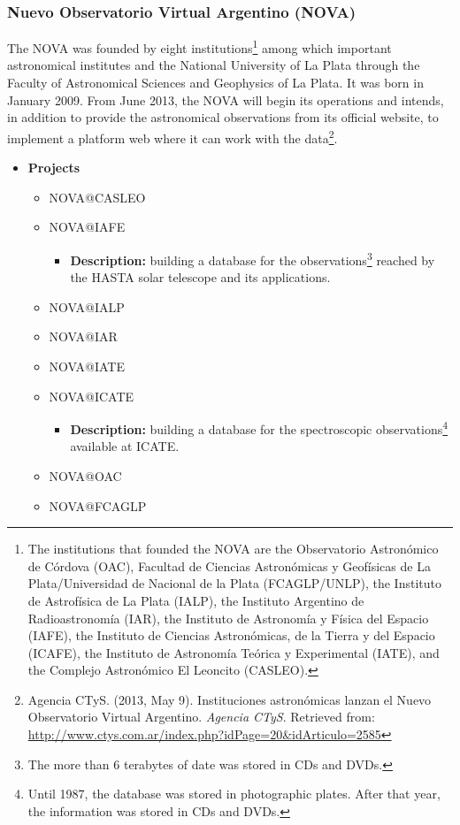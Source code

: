 \subsubsection{Nuevo Observatorio Virtual Argentino (NOVA)}
The NOVA \cite{website:nova-home} was founded by eight institutions\footnote{The
institutions that founded the NOVA are the Observatorio Astron\'{o}mico de
C\'{o}rdova (OAC), Facultad de Ciencias Astron\'{o}micas y Geof\'{i}sicas de La
Plata/Universidad de Nacional de la Plata (FCAGLP/UNLP), the Instituto de
Astrof\'{i}sica de La Plata (IALP), the Instituto Argentino de
Radioastronom\'{i}a (IAR), the Instituto de Astronom\'{i}a y F\'{i}sica del
Espacio (IAFE), the Instituto de Ciencias Astron\'{o}micas, de la Tierra y del
Espacio (ICAFE), the Instituto de Astronom\'{i}a Te\'{o}rica y Experimental
(IATE), and the Complejo Astron\'{o}mico El Leoncito (CASLEO).} among which
important astronomical institutes and the National University of La Plata
through the Faculty of Astronomical Sciences and Geophysics of La Plata. It was
born in January 2009.  From June 2013, the NOVA will begin its operations and
intends, in addition to provide the astronomical observations from its official
website, to implement a platform web where it can work with the
data\footnote{Agencia CTyS. (2013, May 9). Instituciones astron\'{o}micas lanzan
el Nuevo Observatorio Virtual Argentino. \textit{Agencia CTyS}. Retrieved from:
\url{http://www.ctys.com.ar/index.php?idPage=20&idArticulo=2585}}.

\begin{itemize}
\item \textbf{Projects}
\begin{itemize}
\item NOVA@CASLEO
\item NOVA@IAFE
\begin{itemize}
\item \textbf{Description:} building a database for the
observations\footnote{The more than 6 terabytes of date was stored in CDs and
DVDs.} reached by the HASTA solar telescope and its applications.
\end{itemize}
\item NOVA@IALP
\item NOVA@IAR
\item NOVA@IATE
\item NOVA@ICATE
\begin{itemize}
\item \textbf{Description:} building a database for the spectroscopic
observations\footnote{Until 1987, the database was stored in photographic
plates. After that year, the information was stored in CDs and DVDs.} available
at ICATE.
\end{itemize}
\item NOVA@OAC
\item NOVA@FCAGLP
\end{itemize}
\end{itemize}

